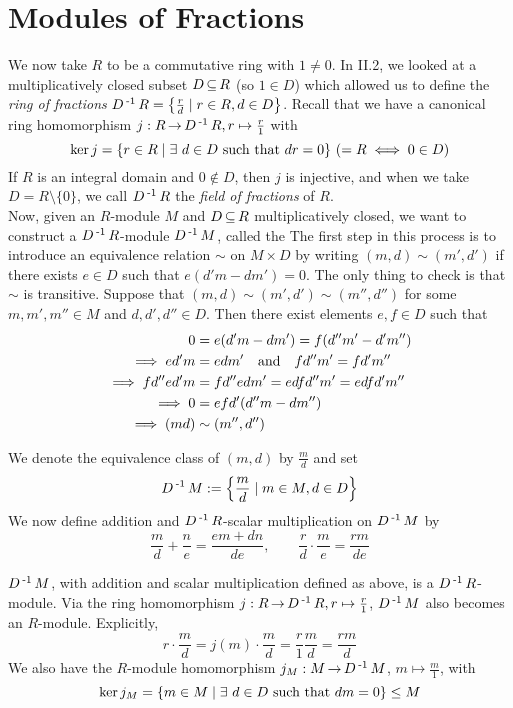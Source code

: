 \documentclass[11pt]{book}
\theoremstyle{definition}   \newtheorem{defn}[counter]{Definition} %
\newcommand{\bs}{\setminus}   \newcommand{\A}{\mathcal{A}}   \newcommand{\sy}{\textnormal{Syl}}   \newcommand{\size}[1]{\left| #1 \right|}
\DeclareMathOperator{\ra}{\rightarrow}   \DeclareMathOperator{\Poly}{\mathbf{P}}   \DeclareMathOperator{\spn}{\textnormal{span}}   \DeclareMathOperator{\aut}{\textnormal{Aut}}
\newcommand{\vs}{\vspace{8pt}}
\numberwithin{counter}{chapter}
\begin{document}
\vs





\chapter{\null \quad Modules of Fractions}

We now take $R$ to be a commutative ring with $1 \ne 0$. In II.2, we looked at a multiplicatively closed subset $D \operatorname{\subseteq} R$ (so $1 \in D$) which allowed us to define the \emph{ring of fractions} $D\operatorname{^{-1}} R = \left\{\frac{r}{d} \mid r \in R, d \in D\right\}$. Recall that we have a canonical ring homomorphism $j : R \ra D\inv R, r \mapsto \frac{r}{1}$ with
	\[\ker j = \{r \in R \mid \exists \ d \in D \textnormal{ such that } dr = 0\} \ (= R \iff 0 \in D) \]
If $R$ is an integral domain and $0 \notin D$, then $j$ is injective, and when we take $D = R \bs \{0\}$, we call $D\operatorname{^{-1}} R$ the \emph{field of fractions} of $R$. \\

Now, given an $R$-module $M$ and $D \operatorname{\subseteq} R$ multiplicatively closed, we want to construct a $D\operatorname{^{-1}} R$-module $D\operatorname{^{-1}} M$, called the  The first step in this process is to introduce an equivalence relation $\sim$ on $M \times D$ by writing $(m,d) \sim (m',d')$ if there exists $e \in D$ such that $e(d'm - dm') = 0$. The only thing to check is that $\sim$ is transitive. Suppose that $(m,d) \sim (m',d') \sim (m'',d'')$ for some $m,m',m'' \in M$ and $d,d',d'' \in D$. Then there exist elements $e,f \in D$ such that 
\begin{align*}
0 &= e(d'm - dm') = f(d''m' - d'm'') \\
\implies ed'm &= edm' \quad \textnormal{and} \quad fd''m' = fd'm'' \\
\implies fd''ed'm &= fd''edm' = edfd''m' = edfd'm'' \\
\implies 0 &= efd'(d''m-dm'') \\
\implies (md) &\sim (m'',d'')
\end{align*}

We denote the equivalence class of $(m,d)$ by $\frac{m}{d}$ and set
	\[ D\operatorname{^{-1}} M := \left\{\frac{m}{d} \mid m \in M, d \in D \right\} \]
We now define addition and $D\operatorname{^{-1}} R$-scalar multiplication on $D\operatorname{^{-1}} M$ by
	\[\frac{m}{d} + \frac{n}{e} = \frac{em + dn}{de}, \qquad \frac{r}{d} \cdot \frac{m}{e} = \frac{rm}{de} \]

\vs

\begin{lemma}
$D\operatorname{^{-1}} M$, with addition and scalar multiplication defined as above, is a $D\operatorname{^{-1}} R$-module. Via the ring homomorphism $j : R \ra D\inv R, r \mapsto \frac{r}{1}$, $D\operatorname{^{-1}} M$ also becomes an $R$-module. Explicitly,
	\[r \cdot \frac{m}{d} = j(m) \cdot \frac{m}{d} = \frac{r}{1} \frac{m}{d} = \frac{rm}{d} \]
We also have the $R$-module homomorphism $j_M : M \ra D\inv M$, $m \mapsto \frac{m}{1}$, with
	\[\ker j_M = \{m \in M \mid \exists \ d \in D \textnormal{ such that } dm = 0 \} \leq M \]
\end{lemma}
\end{document}
